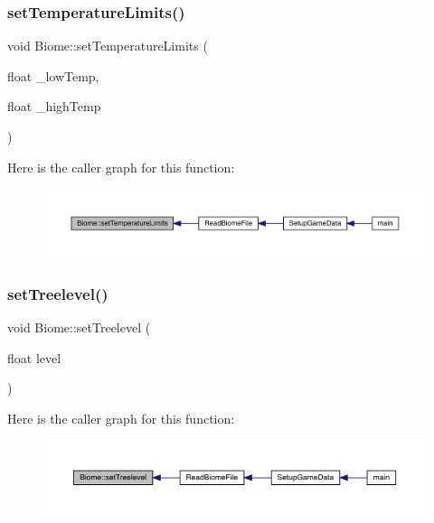 \subsubsection{\texorpdfstring{set\+Temperature\+Limits()}{setTemperatureLimits()}}
{\footnotesize\ttfamily void Biome\+::set\+Temperature\+Limits (\begin{DoxyParamCaption}\item[{float}]{\+\_\+low\+Temp,  }\item[{float}]{\+\_\+high\+Temp }\end{DoxyParamCaption})}

Here is the caller graph for this function\+:
\nopagebreak
\begin{figure}[H]
\begin{center}
\leavevmode
\includegraphics[width=350pt]{class_biome_acc568302ef1e66d443d2e43d94b36a10_icgraph}
\end{center}
\end{figure}
\mbox{\label{class_biome_adb9f34f853f233464a33a5dfbb2ccbee}} 
\subsubsection{\texorpdfstring{set\+Treelevel()}{setTreelevel()}}
{\footnotesize\ttfamily void Biome\+::set\+Treelevel (\begin{DoxyParamCaption}\item[{float}]{level }\end{DoxyParamCaption})}

Here is the caller graph for this function\+:
\nopagebreak
\begin{figure}[H]
\begin{center}
\leavevmode
\includegraphics[width=350pt]{class_biome_adb9f34f853f233464a33a5dfbb2ccbee_icgraph}
\end{center}
\end{figure}
\mbox{\label{class_biome_adbe071450d7411ddd3f886b1c84c2029}} 
